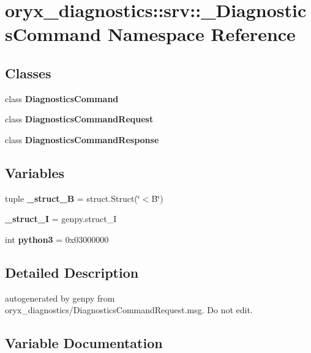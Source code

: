 \section{oryx\-\_\-diagnostics\-:\-:srv\-:\-:\-\_\-\-Diagnostics\-Command \-Namespace \-Reference}
\label{namespaceoryx__diagnostics_1_1srv_1_1__DiagnosticsCommand}
\subsection*{\-Classes}
\begin{DoxyCompactItemize}
\item 
class {\bf \-Diagnostics\-Command}
\item 
class {\bf \-Diagnostics\-Command\-Request}
\item 
class {\bf \-Diagnostics\-Command\-Response}
\end{DoxyCompactItemize}
\subsection*{\-Variables}
\begin{DoxyCompactItemize}
\item 
tuple {\bf \-\_\-struct\-\_\-\-B} = struct.\-Struct(\char`\"{}$<$\-B\char`\"{})
\item 
{\bf \-\_\-struct\-\_\-\-I} = genpy.\-struct\-\_\-\-I
\item 
int {\bf python3} = 0x03000000
\end{DoxyCompactItemize}


\subsection{\-Detailed \-Description}
\begin{DoxyVerb}autogenerated by genpy from oryx_diagnostics/DiagnosticsCommandRequest.msg. Do not edit.\end{DoxyVerb}
 

\subsection{\-Variable \-Documentation}
